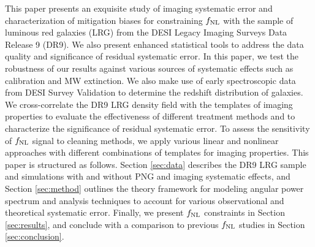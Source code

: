 This paper presents an exquisite study of imaging systematic error and characterization of mitigation biases for constraining $f_{\rm NL}$ with the sample of luminous red galaxies (LRG) from the DESI Legacy Imaging Surveys Data Release 9 (DR9). We also present enhanced statistical tools to address the data quality and significance of residual systematic error. In this paper, we test the robustness of our results against various sources of systematic effects such as calibration and MW extinction. We also make use of early spectroscopic data from DESI Survey Validation to determine the redshift distribution of galaxies. We cross-correlate the DR9 LRG density field with the templates of imaging properties to evaluate the effectiveness of different treatment methods and to characterize the significance of residual systematic error. To assess the sensitivity of $f_{\rm NL}$ signal to cleaning methods, we apply various linear and nonlinear approaches with different combinations of templates for imaging properties. This paper is structured as follows. Section \ref{sec:data} describes the DR9 LRG sample and simulations with and without PNG and imaging systematic effects, and Section \ref{sec:method} outlines the theory framework for modeling angular power spectrum and analysis techniques to account for various observational and theoretical systematic error. Finally, we present $f_{\rm NL}$ constraints in Section \ref{sec:results}, and conclude with a comparison to previous $f_{\rm NL}$ studies in Section \ref{sec:conclusion}.